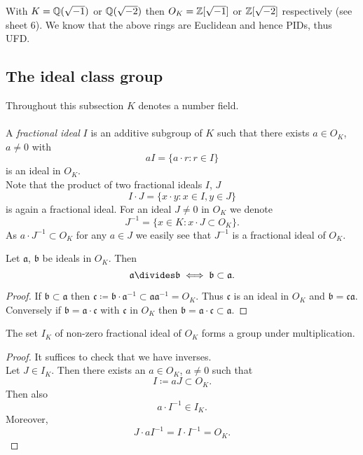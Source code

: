 \documentclass[NumTh.tex]{subfiles}
\begin{document}
\begin{ex}
  With $K = \mathbb{Q}(\sqrt{-1})$ or $\mathbb{Q}(\sqrt{-2})$ then $O_K = \mathbb{Z}[\sqrt{-1}]$ or $\mathbb{Z}[\sqrt{-2}]$ respectively (see sheet 6).
  We know that the above rings are Euclidean and hence PIDs, thus UFD.
\end{ex}


\subsection{The ideal class group}

Throughout this subsection $K$ denotes a number field.\\
\\
A \emph{fractional ideal} $I$ is an additive subgroup of $K$ such that there exists $a \in O_K$, $a \neq 0$ with
\[ aI = \{ a \cdot r : r \in I \} \]
is an ideal in $O_K$.\\
Note that the product of two fractional ideals $I$, $J$
\[ I \cdot J = \{ x \cdot y : x \in I, y \in J \} \]
is again a fractional ideal.
For an ideal $J \neq 0$ in $O_K$ we denote
\[ J^{-1} = \{ x \in K : x \cdot J \subset O_K \} \text{.} \]
As $a \cdot J^{-1} \subset O_K$ for any $a \in J$ we easily see that $J^{-1}$ is a fractional ideal of $O_K$.

\begin{lemma}
  Let $\mathfrak{a}$, $\mathfrak{b}$ be ideals in $O_K$.
  Then 
  \[ \mathfrak{a} \divides \mathfrak{b} \iff \mathfrak{b} \subset \mathfrak{a} \text{.} \]
\end{lemma}

\begin{proof}
  If $\mathfrak{b} \subset \mathfrak{a}$ then $\mathfrak{c} \coloneq \mathfrak{b} \cdot \mathfrak{a}^{-1} \subset \mathfrak{a} \mathfrak{a}^{-1} = O_K$.
  Thus $\mathfrak{c}$ is an ideal in $O_K$ and $\mathfrak{b} = \mathfrak{c} \mathfrak{a}$.
  Conversely if $\mathfrak{b} = \mathfrak{a} \cdot \mathfrak{c}$ with $\mathfrak{c}$ in $O_K$ then $\mathfrak{b} = \mathfrak{a} \cdot \mathfrak{c} \subset \mathfrak{a}$.
\end{proof}

\begin{lemma}\label{l_3_4_2}
  The set $I_K$ of non-zero fractional ideal of $O_K$ forms a group under multiplication.
\end{lemma}

\begin{proof}
  It suffices to check that we have inverses.\\
  Let $J \in I_K$.
  Then there exists an $a \in O_K$, $a \neq 0$ such that 
  \[ I \coloneq a J \subset O_K \text{.} \]
  Then also
  \[ a \cdot I^{-1} \in I_K \text{.} \]
  Moreover,
  \[ J \cdot a I^{-1} = I \cdot I^{-1} = O_K \text{.} \]
\end{proof}
\end{document}
